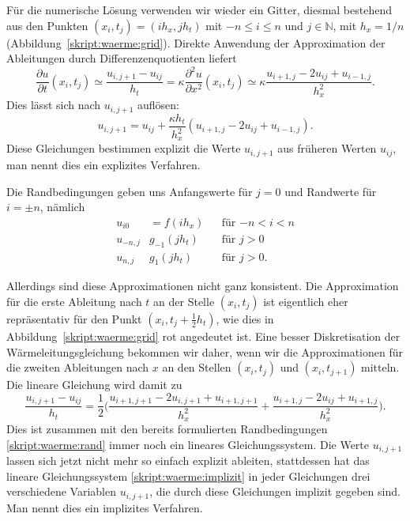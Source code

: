 Für die numerische Lösung verwenden wir wieder ein Gitter, diesmal bestehend
aus den Punkten $(x_i, t_j)=(ih_x, jh_t)$ mit $-n \le i \le n$ und
$j\in\mathbb N$, mit $h_x=1/n$ (Abbildung~\ref{skript:waerme:grid}).
Direkte Anwendung der Approximation der Ableitungen durch
Differenzenquotienten liefert
\begin{equation}
\frac{\partial u}{\partial t}(x_i,t_j)
\simeq
\frac{u_{i,j+1}-u_{ij}}{h_t}
=
\kappa
\frac{\partial^2u}{\partial x^2}(x_i,t_j)
\simeq
\kappa
\frac{u_{i+1,j}-2u_{ij}+u_{i-1,j}}{h_x^2}.
\end{equation}
Dies lässt sich nach $u_{i,j+1}$ auflösen:
\[
u_{i,j+1}
=
u_{ij}
+
\frac{\kappa h_t}{h_x^2} (u_{i+1,j}-2u_{ij}+u_{i-1,j}).
\]
Diese Gleichungen bestimmen explizit die Werte $u_{i,j+1}$ aus früheren Werten
$u_{ij}$, man nennt dies ein explizites Verfahren.

Die Randbedingungen geben uns Anfangswerte für $j=0$ und Randwerte
für $i=\pm n$, nämlich
\begin{equation}
\begin{aligned}
u_{i0} &= f(ih_x)&&\text{für $-n<i<n$}\\
u_{-n,j} & g_{-1}(jh_t)&&\text{für $j>0$}\\
u_{n,j} & g_{1}(jh_t)&&\text{für $j>0$.}
\end{aligned}
\label{skript:waerme:rand}
\end{equation}

Allerdings sind diese Approximationen nicht ganz konsistent.
Die Approximation für die erste Ableitung nach $t$ an der Stelle
$(x_i,t_j)$ ist eigentlich eher repräsentativ für den Punkt
$(x_i,t_j+\frac12h_t)$, wie dies in Abbildung~\ref{skript:waerme:grid}
{\color{red}rot}
angedeutet ist.
Eine besser Diskretisation der Wärmeleitungsgleichung bekommen wir daher,
wenn wir die Approximationen für die zweiten Ableitungen nach $x$ an
den Stellen $(x_i,t_j)$  und $(x_i,t_{j+1})$ mitteln. 
Die lineare Gleichung wird damit zu
\begin{equation}
\frac{u_{i,j+1}-u_{ij}}{h_t}
=
\frac12\biggl(
\frac{u_{i+1,j+1}-2u_{i,j+1}+u_{i+1,j+1}}{h_x^2}
+
\frac{u_{i+1,j}-2u_{ij}+u_{i+1,j}}{h_x^2}
\biggr).
\label{skript:waerme:implizit}
\end{equation}
Dies ist zusammen mit den bereits formulierten Randbedingungen
\eqref{skript:waerme:rand}
immer noch ein lineares Gleichungssystem.
Die Werte $u_{i,j+1}$ lassen sich jetzt nicht mehr so einfach
explizit ableiten, stattdessen hat das lineare Gleichungssystem
\eqref{skript:waerme:implizit}
in jeder Gleichungen drei verschiedene Variablen $u_{i,j+1}$,
die durch diese Gleichungen implizit gegeben sind.
Man nennt dies ein implizites Verfahren.

